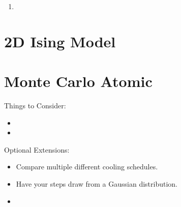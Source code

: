 \documentclass[11pt,]{article}   	%
\begin{document}
\begin{enumerate}
\item 
\end{enumerate}

\part {2D Ising Model} 


\part{Monte Carlo Atomic }

\noindent Things to Consider: 
\begin{itemize}
\item 
\item 
\end{itemize}

\noindent Optional Extensions: 
\begin{itemize}
\item Compare multiple different cooling schedules. 
\item Have your steps draw from a Gaussian distribution. 
\item 
\end{itemize}
\end{document}
